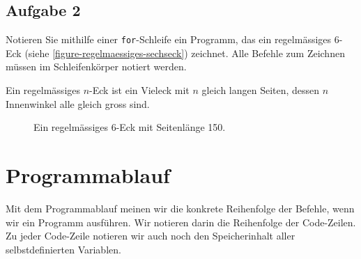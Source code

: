 \subsection{Aufgabe 2}

Notieren Sie mithilfe einer \lstinline{for}-Schleife ein Programm, das ein regelmässiges \num{6}-Eck (siehe \autoref{figure-regelmaessiges-sechseck}) zeichnet. Alle Befehle zum Zeichnen müssen im Schleifenkörper notiert werden.

\begin{hinweis}
Ein regelmässiges $n$-Eck ist ein Vieleck mit $n$ gleich langen Seiten, dessen $n$ Innenwinkel alle gleich gross sind.
\end{hinweis}

\begin{figure}[htb]
\centering
\begin{minipage}{0.55\textwidth}
\centering
\fillwithgrid{2in}
\end{minipage}
\hfill
\begin{minipage}{0.375\textwidth}
\centering
{}
\caption{Ein regelmässiges \num{6}-Eck mit Seitenlänge \num{150}.}
\label{figure-regelmaessiges-sechseck}
\end{minipage}
\end{figure}

\section{Programmablauf}

Mit dem Programmablauf meinen wir die konkrete Reihenfolge der Befehle, wenn wir ein Programm ausführen. Wir notieren darin die Reihenfolge der Code-Zeilen. Zu jeder Code-Zeile notieren wir auch noch den Speicherinhalt aller selbstdefinierten Variablen.

